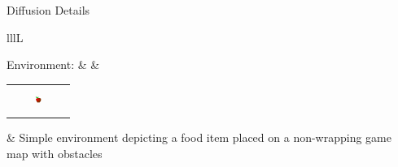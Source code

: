 \documentclass{beamer}
\begin{document}
\begin{frame}{Diffusion Details}\fontsize{6pt}{7}\selectfont

\begin{tabular}{lllL}

 Environment: & & \begin{tabular}{|p{0.03in}|p{0.03in}|p{0.03in}|p{0.03in}|p{0.03in}|}
		\hline
		  &  &  &  &  \\ \hline
		  &  &  &  &  \\ \hline
		  &  & \includegraphics[width=0.08in]{apple.png} & \cellcolor{black} &  \\ \hline
		  &  &  & \cellcolor{black} &  \\ \hline
		  &  &  & \cellcolor{black} &  \\ 
		\hline
	      \end{tabular} & Simple environment depicting a food item placed on a non-wrapping game map with obstacles \\ \\
	      

\end{tabular}
\end{frame}
\end{document}

